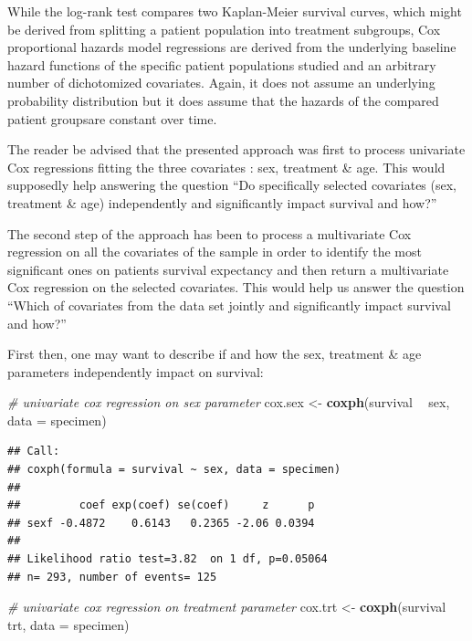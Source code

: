 \documentclass[]{article}
\newenvironment{Shaded}{\begin{snugshade}}{\end{snugshade}}
\newcommand{\KeywordTok}[1]{\textcolor[rgb]{0.13,0.29,0.53}{\textbf{#1}}}
\newcommand{\DataTypeTok}[1]{\textcolor[rgb]{0.13,0.29,0.53}{#1}}
\newcommand{\StringTok}[1]{\textcolor[rgb]{0.31,0.60,0.02}{#1}}
\newcommand{\CommentTok}[1]{\textcolor[rgb]{0.56,0.35,0.01}{\textit{#1}}}
\newcommand{\OperatorTok}[1]{\textcolor[rgb]{0.81,0.36,0.00}{\textbf{#1}}}
\newcommand{\NormalTok}[1]{#1}
\begin{document}
While the log-rank test compares two Kaplan-Meier survival curves, which
might be derived from splitting a patient population into treatment
subgroups, Cox proportional hazards model regressions are derived from
the underlying baseline hazard functions of the specific patient
populations studied and an arbitrary number of dichotomized covariates.
Again, it does not assume an underlying probability distribution but it
does assume that the hazards of the compared patient groupsare constant
over time.

The reader be advised that the presented approach was first to process
univariate Cox regressions fitting the three covariates : sex, treatment
\& age. This would supposedly help answering the question ``Do
specifically selected covariates (sex, treatment \& age) independently
and significantly impact survival and how?''

The second step of the approach has been to process a multivariate Cox
regression on all the covariates of the sample in order to identify the
most significant ones on patients survival expectancy and then return a
multivariate Cox regression on the selected covariates. This would help
us answer the question ``Which of covariates from the data set jointly
and significantly impact survival and how?''

First then, one may want to describe if and how the sex, treatment \&
age parameters independently impact on survival:

\begin{Shaded}
\begin{Highlighting}[]
\CommentTok{# univariate cox regression on sex parameter}
\NormalTok{cox.sex <-}\StringTok{ }\KeywordTok{coxph}\NormalTok{(survival }\OperatorTok{~}\StringTok{ }\NormalTok{sex, }\DataTypeTok{data =}\NormalTok{ specimen)}
\end{Highlighting}
\end{Shaded}

\begin{verbatim}
## Call:
## coxph(formula = survival ~ sex, data = specimen)
## 
##         coef exp(coef) se(coef)     z      p
## sexf -0.4872    0.6143   0.2365 -2.06 0.0394
## 
## Likelihood ratio test=3.82  on 1 df, p=0.05064
## n= 293, number of events= 125
\end{verbatim}

\begin{Shaded}
\begin{Highlighting}[]
\CommentTok{# univariate cox regression on treatment parameter}
\NormalTok{cox.trt <-}\StringTok{ }\KeywordTok{coxph}\NormalTok{(survival }\OperatorTok{~}\StringTok{ }\NormalTok{trt, }\DataTypeTok{data =}\NormalTok{ specimen)}
\end{Highlighting}
\end{Shaded}
\end{document}
